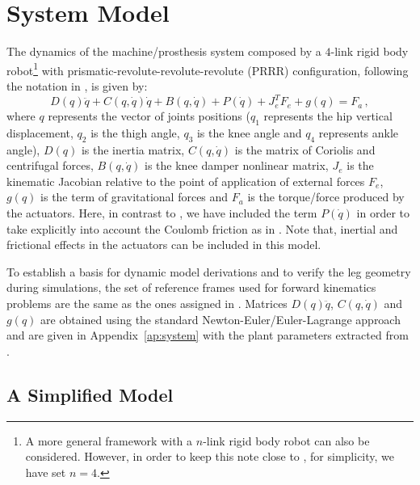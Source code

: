 \documentclass[letterpaper, 10 pt, journal, twocolumn]{IEEEtran}  %
\theoremstyle{plain}
\theoremstyle{definition}
\theoremstyle{remark}
\begin{document}

\section{System Model}
\label{sec:System_model}

The dynamics of the machine/prosthesis system composed by a $4$-link rigid body robot\footnote{A more general framework with a $n$-link rigid body robot can also be considered. However, in order to keep this note close to \cite{Richter2015}, for simplicity, we have set $n=4$.}  with prismatic-revolute-revolute-revolute (PRRR) configuration, following the notation in \cite{Richter2015}, is given by:
%
\begin{equation}
D(q)\ddot{q} + C(q,\dot{q})\dot{q}+B(q,\dot{q}) + P(\dot{q}) + J_e^T F_e+g(q) = F_a\,,
\label{eq:Dinamica}
\end{equation}
%
where  $q$ represents the vector of joints positions ($q_1$ represents the hip vertical displacement, $q_2$ is the thigh angle, $q_3$ is the knee angle and $q_4$ represents ankle angle), $D(q)$ is the inertia matrix, $C(q,\dot{q})$ is the matrix of Coriolis and centrifugal forces, $B(q,\dot{q})$ is the knee  damper nonlinear matrix, $J_e$ is the kinematic Jacobian relative to the point of application of external forces $F_e$, $g(q)$ is the term of gravitational forces and $F_a$ is the torque/force produced by the actuators. Here, in contrast to \cite{Richter2015}, we have included the term  $P(\dot{q})$ in order to take explicitly into account the Coulomb friction as in \cite{LeeKhalil2015}. Note that, inertial and frictional effects in the actuators can be included in this model. 

To establish a basis for dynamic model derivations and to verify the leg geometry during simulations, the set of reference frames used for forward kinematics problems are the same as the ones assigned in \cite{Richter2015}. Matrices $D(q)\ddot{q}$, $C(q,\dot{q})$ and $g(q)$ are obtained using the standard Newton-Euler/Euler-Lagrange approach and are given in Appendix~\ref{ap:system} with the plant parameters  extracted from \cite{Richter2015}.

\subsection{A Simplified Model}
\end{document}
